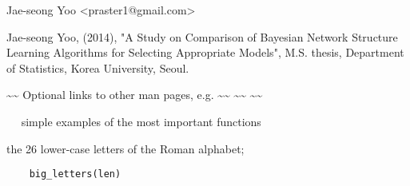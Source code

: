 \documentclass[letterpaper]{book}
\begin{document}
%
\begin{Details}\relax


\end{Details}
%
\begin{Author}\relax
Jae-seong Yoo <praster1@gmail.com>
\end{Author}
%
\begin{References}\relax
Jae-seong Yoo, (2014), "A Study on Comparison of Bayesian Network Structure Learning Algorithms for Selecting Appropriate Models", M.S. thesis, Department of Statistics, Korea University, Seoul.
\end{References}
%
\begin{SeeAlso}\relax
\textasciitilde{}\textasciitilde{} Optional links to other man pages, e.g. \textasciitilde{}\textasciitilde{}
\textasciitilde{}\textasciitilde{}  \textasciitilde{}\textasciitilde{}
\end{SeeAlso}
%
\begin{Examples}
\begin{ExampleCode}
~~ simple examples of the most important functions ~~
\end{ExampleCode}
\end{Examples}
%
\begin{Description}\relax
the 26 lower-case letters of the Roman alphabet;
\end{Description}
%
\begin{Usage}
\begin{verbatim}
	big_letters(len)
\end{verbatim}
\end{Usage}
%
\begin{Arguments}
\begin{ldescription}
\item[\code{len}] 


\end{ldescription}
\end{Arguments}
\end{document}
